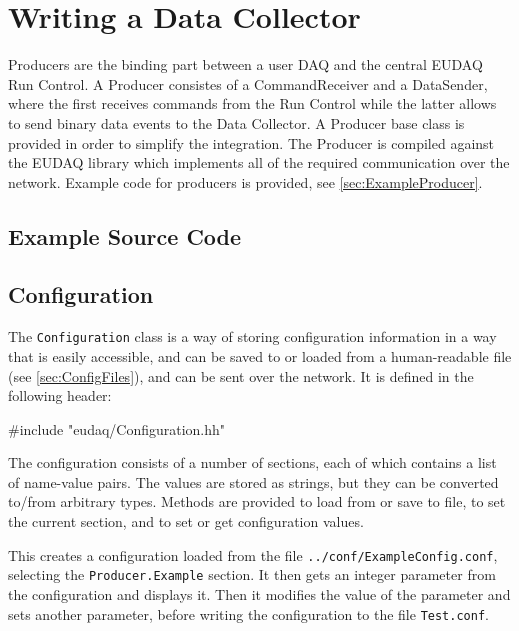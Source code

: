 \section{Writing a Data Collector}\label{sec:DataCollector}
Producers are the binding part between a user DAQ and the central EUDAQ Run Control.
A Producer consistes of a CommandReceiver and a DataSender, where the first receives commands from the Run Control while the latter allows to send binary data events to the Data Collector.
A Producer base class is provided in order to simplify the integration.
The Producer is compiled against the EUDAQ library which implements all of the required communication over the network.
Example code for producers is provided, see \autoref{sec:ExampleProducer}.

\subsection{Example Source Code}\label{sec:Ex0DataCollector_cc}
\newpage


\subsection{Configuration}
The \texttt{Configuration} class is a way of storing configuration information
in a way that is easily accessible, and can be saved to or loaded from a human-readable file
(see \autoref{sec:ConfigFiles}), and can be sent over the network.
It is defined in the following header:

\begin{listing}
#include "eudaq/Configuration.hh"
\end{listing}

The configuration consists of a number of sections,
each of which contains a list of name-value pairs.
The values are stored as strings, but they can be converted to/from arbitrary types.
Methods are provided to load from or save to file, to set the current section,
and to set or get configuration values.

This creates a configuration loaded from the file \texttt{../conf/ExampleConfig.conf},
selecting the \texttt{Producer.Example} section.
It then gets an integer parameter from the configuration and displays it.
Then it modifies the value of the parameter and sets another parameter,
before writing the configuration to the file \texttt{Test.conf}.


